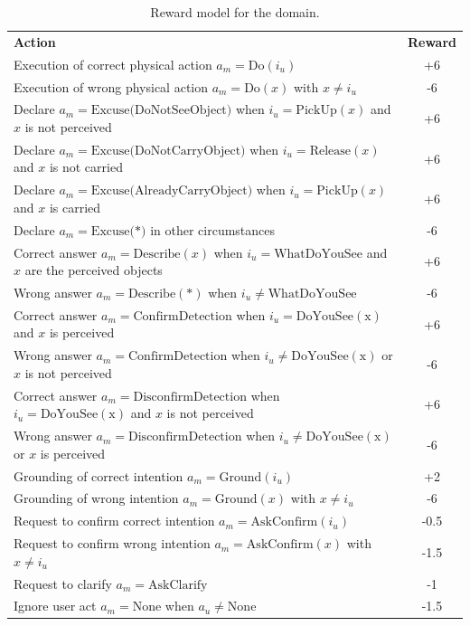 \begin{table}[h]
\begin{center}
\begin{footnotesize}
\begin{tabular}{p{130mm}c} 
\centering \textbf{Action} & \textbf{Reward} \\
Execution of correct physical action $a_m\!=\!\mathrm{Do}(i_u)$ & +6 \\
Execution of wrong physical action $a_m\!=\!\mathrm{Do}(x)$ with $x\!\neq\!i_u$ & -6  \\
Declare $a_m\!=\!\mathrm{Excuse(DoNotSeeObject})$ when $i_u\!=\!\mathrm{PickUp}(x)$ and $x$ is not perceived & +6 \\
Declare $a_m\!=\!\mathrm{Excuse(DoNotCarryObject})$ when $i_u\!=\!\mathrm{Release}(x)$ and $x$ is not carried & +6 \\
Declare $a_m\!=\!\mathrm{Excuse(AlreadyCarryObject})$ when $i_u\!=\!\mathrm{PickUp}(x)$ and $x$ is carried & +6 \\
Declare $a_m\!=\!\mathrm{Excuse(*})$ in other circumstances & -6 \\
Correct answer $a_m\!=\!\mathrm{Describe}(x)$ when $i_u\!=\!\mathrm{WhatDoYouSee}$ and $x$ are the perceived objects & +6 \\
Wrong answer $a_m\!=\!\mathrm{Describe}(*)$ when $i_u\!\neq\!\mathrm{WhatDoYouSee}$ & -6 \\
Correct answer $a_m\!=\!\mathrm{ConfirmDetection}$ when $i_u\!=\!\mathrm{DoYouSee(x)}$ and $x$ is perceived & +6 \\
Wrong answer $a_m\!=\!\mathrm{ConfirmDetection}$ when $i_u\!\neq\!\mathrm{DoYouSee(x)}$ or $x$ is not perceived & -6 \\
Correct answer $a_m\!=\!\mathrm{DisconfirmDetection}$ when $i_u\!=\!\mathrm{DoYouSee(x)}$ and $x$ is not perceived & +6 \\
Wrong answer $a_m\!=\!\mathrm{DisconfirmDetection}$ when $i_u\!\neq\!\mathrm{DoYouSee(x)}$ or $x$ is perceived & -6 \\
Grounding of correct intention $a_m\!=\!\mathrm{Ground}(i_u)$ & +2 \\
Grounding of wrong intention  $a_m\!=\!\mathrm{Ground}(x)$ with $x\!\neq\!i_u$ & -6  \\ 
Request to confirm correct intention $a_m\!=\!\mathrm{AskConfirm}(i_u)$ & -0.5 \\
Request to confirm wrong intention  $a_m\!=\!\mathrm{AskConfirm}(x)$ with $x\!\neq\!i_u$ & -1.5  \\ 
Request to clarify $a_m\!=\!\mathrm{AskClarify}$ & -1 \\
Ignore user act $a_m\!=\!\mathrm{None}$ when $a_u\!\neq\!\mathrm{None}$ & -1.5 
\end{tabular}
\end{footnotesize}
\end{center}  
\caption{Reward model for the domain.} 
\label{table:rewards}
\end{table}


